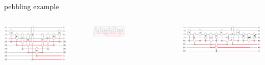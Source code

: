 \begin{frame}{pebbling example}
\begin{columns}
      \begin{minipage}[c][0.4\textheight][c]{\linewidth}
          \centering
          \includegraphics[width=0.8\textwidth]{figure/a.png}
      \end{minipage}
      \begin{minipage}[c][0.4\textheight][c]{\linewidth}
        \centering
        \includegraphics[width=0.4\textwidth]{figure/c.png}
      \end{minipage}
      \begin{minipage}[c][0.4\textwidth][c]{\linewidth}
          \centering
          \includegraphics[width=0.8\linewidth]{figure/c.png}
      \end{minipage}
  \end{columns}
\end{frame}
